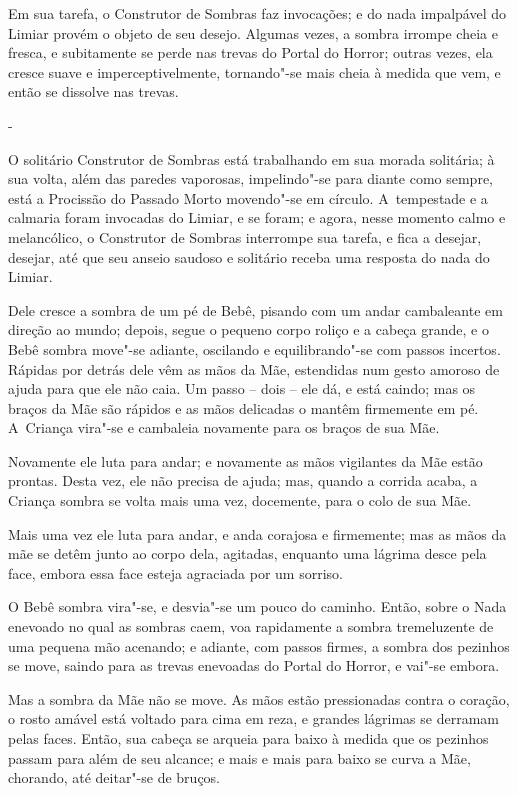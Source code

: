 Em sua tarefa, o Construtor de Sombras faz invocações; e do nada
impalpável do Limiar provém o objeto de seu desejo. Algumas vezes, a
sombra irrompe cheia e fresca, e subitamente se perde nas trevas do
Portal do Horror; outras vezes, ela cresce suave e imperceptivelmente,
tornando"-se mais cheia à medida que vem, e então se dissolve nas trevas.

-

O solitário Construtor de Sombras está trabalhando em sua morada
solitária; à sua volta, além das paredes vaporosas, impelindo"-se para
diante como sempre, está a Procissão do Passado Morto movendo"-se em
círculo. A~tempestade e a calmaria foram invocadas do Limiar, e se
foram; e agora, nesse momento calmo e melancólico, o Construtor de
Sombras interrompe sua tarefa, e fica a desejar, desejar, até que seu
anseio saudoso e solitário receba uma resposta do nada do Limiar.

Dele cresce a sombra de um pé de Bebê, pisando com um andar cambaleante
em direção ao mundo; depois, segue o pequeno corpo roliço e a cabeça
grande, e o Bebê sombra move"-se adiante, oscilando e equilibrando"-se com
passos incertos. Rápidas por detrás dele vêm as mãos da Mãe, estendidas
num gesto amoroso de ajuda para que ele não caia. Um passo -- dois --
ele dá, e está caindo; mas os braços da Mãe são rápidos e as mãos
delicadas o mantêm firmemente em pé. A~Criança vira"-se e cambaleia
novamente para os braços de sua Mãe.

Novamente ele luta para andar; e novamente as mãos vigilantes da Mãe
estão prontas. Desta vez, ele não precisa de ajuda; mas, quando a
corrida acaba, a Criança sombra se volta mais uma vez, docemente, para o
colo de sua Mãe.

Mais uma vez ele luta para andar, e anda corajosa e firmemente; mas as
mãos da mãe se detêm junto ao corpo dela, agitadas, enquanto uma lágrima
desce pela face, embora essa face esteja agraciada por um sorriso.

O Bebê sombra vira"-se, e desvia"-se um pouco do caminho. Então, sobre o
Nada enevoado no qual as sombras caem, voa rapidamente a sombra
tremeluzente de uma pequena mão acenando; e adiante, com passos firmes,
a sombra dos pezinhos se move, saindo para as trevas enevoadas do Portal
do Horror, e vai"-se embora.

Mas a sombra da Mãe não se move. As mãos estão pressionadas contra o
coração, o rosto amável está voltado para cima em reza, e grandes
lágrimas se derramam pelas faces. Então, sua cabeça se arqueia para
baixo à medida que os pezinhos passam para além de seu alcance; e mais e
mais para baixo se curva a Mãe, chorando, até deitar"-se de bruços.

